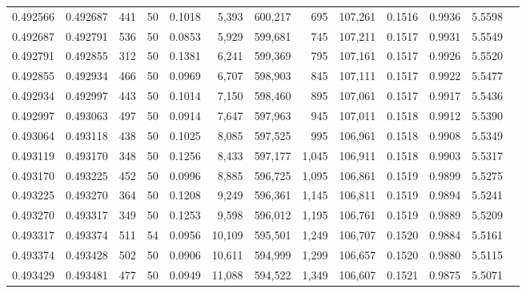 \begin{tabular}{rrrrrrrrrrrrr}
0.492566 & 0.492687 & 441 &  50 &                                     0.1018 &   5,393 & 600,217 &     695 & 107,261 & 0.1516 & 0.9936 & 5.5598 \\
0.492687 & 0.492791 & 536 &  50 &                                     0.0853 &   5,929 & 599,681 &     745 & 107,211 & 0.1517 & 0.9931 & 5.5549 \\
0.492791 & 0.492855 & 312 &  50 &                                     0.1381 &   6,241 & 599,369 &     795 & 107,161 & 0.1517 & 0.9926 & 5.5520 \\
0.492855 & 0.492934 & 466 &  50 &                                     0.0969 &   6,707 & 598,903 &     845 & 107,111 & 0.1517 & 0.9922 & 5.5477 \\
0.492934 & 0.492997 & 443 &  50 &                                     0.1014 &   7,150 & 598,460 &     895 & 107,061 & 0.1517 & 0.9917 & 5.5436 \\
0.492997 & 0.493063 & 497 &  50 &                                     0.0914 &   7,647 & 597,963 &     945 & 107,011 & 0.1518 & 0.9912 & 5.5390 \\
0.493064 & 0.493118 & 438 &  50 &                                     0.1025 &   8,085 & 597,525 &     995 & 106,961 & 0.1518 & 0.9908 & 5.5349 \\
0.493119 & 0.493170 & 348 &  50 &                                     0.1256 &   8,433 & 597,177 &   1,045 & 106,911 & 0.1518 & 0.9903 & 5.5317 \\
0.493170 & 0.493225 & 452 &  50 &                                     0.0996 &   8,885 & 596,725 &   1,095 & 106,861 & 0.1519 & 0.9899 & 5.5275 \\
0.493225 & 0.493270 & 364 &  50 &                                     0.1208 &   9,249 & 596,361 &   1,145 & 106,811 & 0.1519 & 0.9894 & 5.5241 \\
0.493270 & 0.493317 & 349 &  50 &                                     0.1253 &   9,598 & 596,012 &   1,195 & 106,761 & 0.1519 & 0.9889 & 5.5209 \\
0.493317 & 0.493374 & 511 &  54 &                                     0.0956 &  10,109 & 595,501 &   1,249 & 106,707 & 0.1520 & 0.9884 & 5.5161 \\
0.493374 & 0.493428 & 502 &  50 &                                     0.0906 &  10,611 & 594,999 &   1,299 & 106,657 & 0.1520 & 0.9880 & 5.5115 \\
0.493429 & 0.493481 & 477 &  50 &                                     0.0949 &  11,088 & 594,522 &   1,349 & 106,607 & 0.1521 & 0.9875 & 5.5071 \\

\end{tabular}

